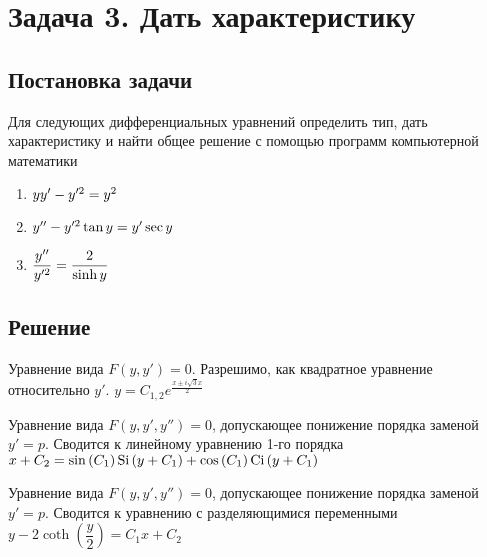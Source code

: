 

\section{Задача 3. Дать характеристику}
\subsection{Постановка задачи}
Для следующих дифференциальных уравнений определить тип, дать характеристику 
и найти общее решение с помощью программ компьютерной математики

\begin{enumerate}
	\item $ yy'-y'^2=y^2 $
	\item $ y''-y'^2\tan{y}=y'\sec{y} $
	\item $ \dfrac{y''}{y'^2}=\dfrac{2}{\sinh{y}} $
\end{enumerate}

\newpage

\subsection{Решение}
\begin{enumerate}
	\solutionItemThird
		{\equationFirst}
		{
			Уравнение вида $ F(y, y') = 0 $.
		}
		{Разрешимо, как квадратное уравнение относительно $ y' $.}
		{$ y = C_{1,2}e^{\tfrac{x \pm i\sqrt{3}x}{2}} $}
	
	\vspace{1.5em}

	\solutionItemThird
		{\equationSecond}
		{
			Уравнение вида $ F(y, y', y'') = 0 $, допускающее 
			понижение порядка заменой $ y' = p $. 
		}
		{Сводится к линейному уравнению 1-го порядка}
		{$ x + C_2 = \sin{(C_1)} \operatorname{Si}{(y + C_1)} + \cos{(C_1)} \operatorname{Ci}{(y + C_1)} $}
		
	\vspace{1.5em}	
		
	\solutionItemThird
		{\equationThird}
		{ 
			Уравнение вида $ F(y, y', y'') = 0 $, допускающее
			понижение порядка заменой $ y' = p $.
		}
		{Сводится к уравнению с разделяющимися переменными}
		{$ y - 2\coth{\left(\dfrac{y}{2}\right)} = C_1x + C_2 $}
\end{enumerate}

